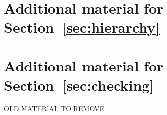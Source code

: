 \documentclass[acmsmall,review,anonymous,screen]{acmart}\settopmatter{printfolios=true,printccs=false,printacmref=true}
\begin{document}
\section{Additional material for Section~\ref{sec:hierarchy}}
\label{apx:hierarchy}


\section{Additional material for Section~\ref{sec:checking}}
\label{apx:checking}



\fi

\ifcomments
\newpage
OLD MATERIAL TO REMOVE


% 
% 
\fi
\end{document}

